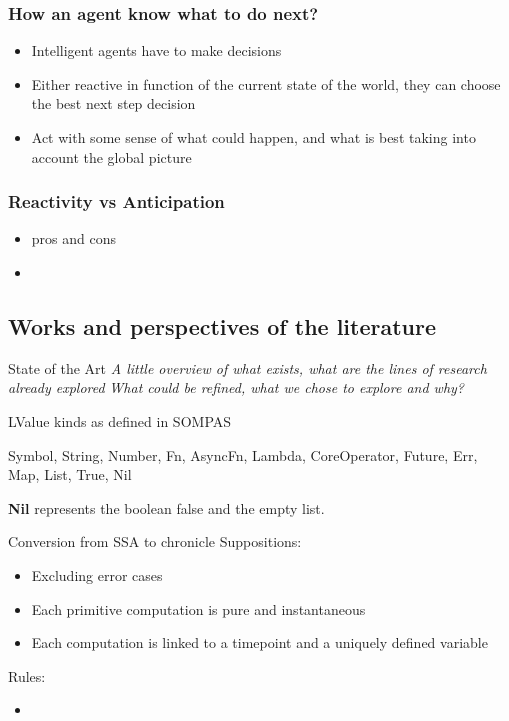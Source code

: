 \begin{frame}
\frametitle{How an agent know what to do next?}
\begin{itemize}
    \item Intelligent agents have to make decisions
    \item Either reactive in function of the current state of the world, they can choose the best next step decision
    \item Act with some sense of what could happen, and what is best taking into account the global picture
\end{itemize}
\end{frame}

\begin{frame}
\frametitle{Reactivity vs Anticipation}
\begin{itemize}
    \item pros and cons
    \item 
\end{itemize}
\end{frame}

\subsection{Works and perspectives of the literature}
\begin{frame}{State of the Art}
    \textit{A little overview of what exists, what are the lines of research already explored}
    \textit{What could be refined, what we chose to explore and why?}
\end{frame}

\begin{frame}{LValue kinds as defined in SOMPAS}
\begin{center}
    Symbol, String, Number, Fn, AsyncFn, Lambda, CoreOperator, Future, Err, Map, List, True, Nil
    
    \textbf{Nil} represents the boolean false and the empty list.
\end{center}
\end{frame}


\begin{frame}[fragile]{Conversion from SSA to chronicle}
    Suppositions:
    \begin{itemize}
        \item Excluding error cases
        \item Each primitive computation is pure and instantaneous
        \item Each computation is linked to a timepoint and a uniquely defined variable
    \end{itemize}
    Rules:
    \begin{itemize}
        \item 
    \end{itemize}
\end{frame}


